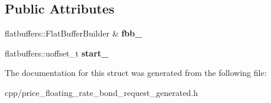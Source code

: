 \subsection*{Public Attributes}
\begin{DoxyCompactItemize}
\item 
\mbox{\label{structquantra_1_1PriceFloatingRateBondRequestBuilder_a727af87bb634614724d93ccba02cabf6}} 
flatbuffers\+::\+Flat\+Buffer\+Builder \& {\bfseries fbb\+\_\+}
\item 
\mbox{\label{structquantra_1_1PriceFloatingRateBondRequestBuilder_abd808720abd415001d616c2a07ca8957}} 
flatbuffers\+::uoffset\+\_\+t {\bfseries start\+\_\+}
\end{DoxyCompactItemize}


The documentation for this struct was generated from the following file\+:\begin{DoxyCompactItemize}
\item 
cpp/price\+\_\+floating\+\_\+rate\+\_\+bond\+\_\+request\+\_\+generated.\+h\end{DoxyCompactItemize}
